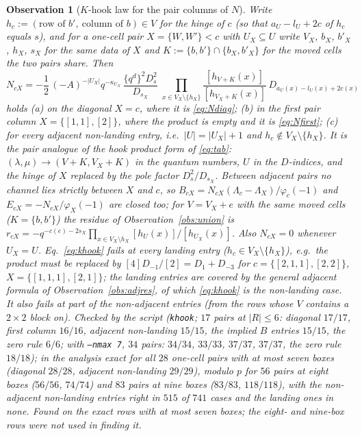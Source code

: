 \documentclass[11pt]{article}
\newtheorem{observation}{Observation}
\newcommand{\Lam}{\Lambda}
\newcommand{\LMPH}[1]{\texttt{#1}}
\begin{document}
\begin{observation}[$K$-hook law for the pair columns of $N$]\label{obs:khook}
Write $h_c:=(\text{row of }b',\ \text{column of }b)\in V$ for the \emph{hinge} of $c$ (so that $a_U-l_U+2c$ of $h_c$
equals $s$), and for a one-cell pair $X=\{W,W'\}<c$ with $U_X\subseteq U$ write $V_X$, $b_X$, $b'_X$, $h_X$, $s_X$ for
the same data of $X$ and $K:=\{b,b'\}\cap\{b_X,b'_X\}$ for the moved cells the two pairs share.  Then
\begin{equation}\label{eq:khook}
N_{cX}=-\frac12\,(-A)^{-|U_X|}q^{-\kappa_{U_X}}\,\frac{\{q^d\}^2D_s^2}{D_{s_X}}\;
\prod_{x\in V_X\setminus\{h_X\}}\frac{[h_{V+K}(x)]}{[h_{V_X+K}(x)]}\,D_{a_U(x)-l_U(x)+2c(x)}
\end{equation}
holds (a) on the diagonal $X=c$, where it is \eqref{eq:Ndiag}; (b) in the first pair column $X=\{[1,1],[2]\}$, where
the product is empty and it is \eqref{eq:Nfirst}; (c) for every \emph{adjacent non-landing} entry, i.e.\
$|U|=|U_X|+1$ and $h_c\notin V_X\setminus\{h_X\}$.  It is the pair analogue of the hook product form of
\eqref{eq:tab}: $(\lambda,\mu)\to(V+K,V_X+K)$ in the quantum numbers, $U$ in the $D$-indices, and the hinge of $X$
replaced by the pole factor $D_s^2/D_{s_X}$.  Between adjacent pairs no channel lies strictly between $X$ and $c$, so
$B_{cX}=N_{cX}(\Lam_c-\Lam_X)/\varphi_c(-1)$ and $E_{cX}=-N_{cX}/\varphi_X(-1)$ are closed too; for $V=V_X+e$ with the
same moved cells ($K=\{b,b'\}$) the residue of Observation~\ref{obs:union} is
$r_{cX}=-q^{-c(e)-2s_X}\prod_{x\in V_X\setminus h_X}[h_U(x)]/[h_{U_X}(x)]$.  Also $N_{cX}=0$ whenever $U_X=U$.
Eq.~\eqref{eq:khook} fails at every landing entry ($h_c\in V_X\setminus\{h_X\}$), e.g.\ the product must be
replaced by $[4]D_{-1}/[2]=D_1+D_{-3}$ for $c=\{[2,1,1],[2,2]\}$, $X=\{[1,1,1],[2,1]\}$; the landing entries are
covered by the general adjacent formula of Observation~\ref{obs:adjres}, of which \eqref{eq:khook} is the non-landing
case.  It also fails at part of the non-adjacent entries (from the rows whose $V$ contains a $2\times2$ block on).  Checked by the script (\LMPH{khook}; $17$ pairs at $|R|\le6$:
diagonal $17/17$, first column $16/16$, adjacent non-landing $15/15$, the implied $B$ entries $15/15$, the zero rule
$6/6$; with \LMPH{--nmax 7}, $34$ pairs: $34/34$, $33/33$, $37/37$, $37/37$, the zero rule $18/18$); in the analysis exact for all $28$ one-cell pairs with at most seven boxes (diagonal $28/28$, adjacent
non-landing $29/29$), modulo $p$ for $56$ pairs at eight boxes ($56/56$, $74/74$) and $83$ pairs at nine boxes
($83/83$, $118/118$), with the non-adjacent non-landing entries right in $515$ of $741$ cases and the landing ones in
none.  Found on the exact rows with at most seven boxes; the eight- and nine-box rows were not used in finding it.
\end{observation}
\end{document}
